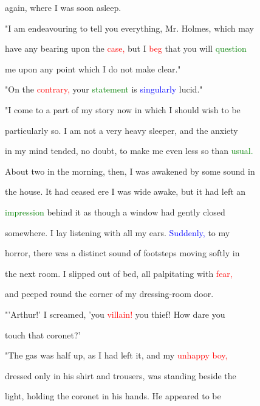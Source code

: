  again, where I was soon asleep.



 "I am endeavouring to tell you everything, Mr. Holmes, which may

 have any bearing upon the \textcolor{red}{case,} but I \textcolor{red}{beg} that you will \textcolor{green}{question}

 me upon any point which I do not make clear."



 "On the \textcolor{red}{contrary,} your \textcolor{green}{statement} is \textcolor{blue}{singularly} lucid."



 "I come to a part of my story now in which I should wish to be

 particularly so. I am not a very heavy sleeper, and the \textcolor{BurntOrange}{anxiety}

 in my mind tended, no \textcolor{BurntOrange}{doubt,} to make me even less so than \textcolor{green}{usual.}

 About two in the morning, then, I was awakened by some sound in

 the house. It had ceased ere I was wide awake, but it had left an

 \textcolor{green}{impression} behind it as though a window had gently closed

 somewhere. I lay listening with all my ears. \textcolor{blue}{Suddenly,} to my

 \textcolor{BurntOrange}{horror,} there was a distinct sound of footsteps moving softly in

 the next room. I \textcolor{BurntOrange}{slipped} out of bed, all palpitating with \textcolor{red}{fear,}

 and peeped round the corner of my dressing-room door.



 "'Arthur!' I \textcolor{BurntOrange}{screamed,} 'you \textcolor{red}{villain!} you \textcolor{BurntOrange}{thief!} How \textcolor{BurntOrange}{dare} you

 touch that coronet?'



 "The gas was half up, as I had left it, and my \textcolor{red}{unhappy} \textcolor{red}{boy,}

 dressed only in his shirt and trousers, was standing beside the

 light, holding the coronet in his hands. He appeared to be

